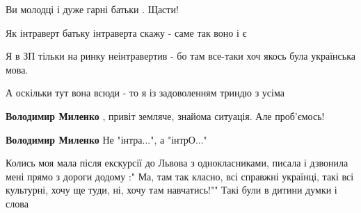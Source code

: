 \begin{itemize}
Ви молодці і дуже гарні батьки . Щасти!

 

Як інтраверт батьку інтраверта скажу - саме так воно і є \Smiley[1.0][yellow]

Я в ЗП тільки на ринку неінтравертив - бо там все-таки хоч якось була
українська мова.

А оскільки тут вона всюди - то я із задоволенням триндю з усіма \Smiley[1.0][yellow]

\begin{itemize}
 
\textbf{Володимир Миленко} , привіт земляче, знайома ситуація. Але проб'ємось!

 
\textbf{Володимир Миленко} Не "інтра...", а "інтрО..."
\end{itemize}

 

Колись моя мала після екскурсії до Львова з однокласниками, писала і дзвонила
мені прямо з дороги додому :" Ма, там так класно, всі справжні українці, такі
всі культурні, хочу ще туди, ні, хочу там навчатись!"" Такі були в дитини думки
і слова

\begin{itemize}
 

\end{itemize}
\end{itemize}
